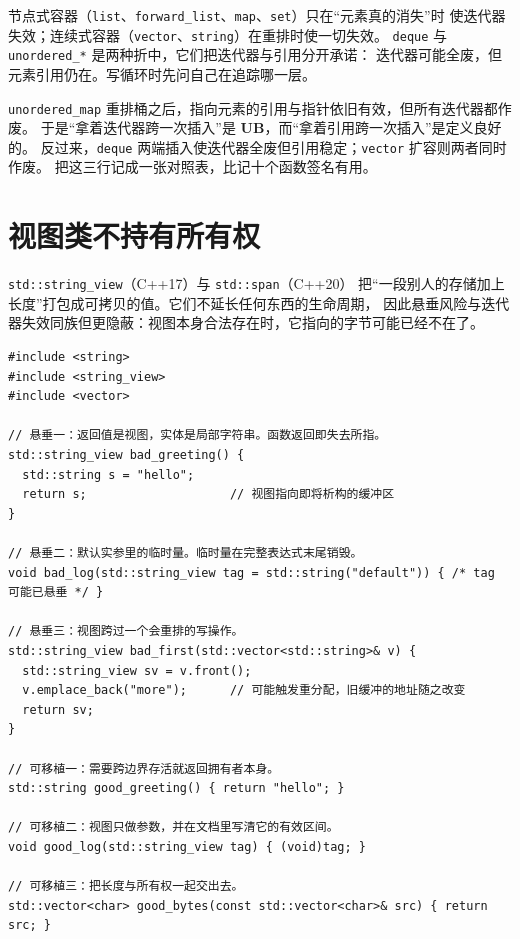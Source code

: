 \documentclass[12pt,a4paper,fontset=fandol]{ctexbook}
\newcommand{\cpp}[1]{C++#1}
\newcommand{\Tp}[1]{\texttt{#1}}
\newcommand{\Bk}{\discretionary{}{}{}}
\newcommand{\UB}{\textbf{\textsf{UB}}}
\begin{document}
\begin{guideline}[title={把长表压成两句话}]
节点式容器（\Tp{list}、\Tp{forward{\Bk}\_list}、\Tp{map}、\Tp{set}）只在“元素真的消失”时
使迭代器失效；连续式容器（\Tp{vector}、\Tp{string}）在重排时使一切失效。
\Tp{deque} 与 \Tp{unordered{\Bk}\_*} 是两种折中，它们把迭代器与引用分开承诺：
迭代器可能全废，但元素引用仍在。写循环时先问自己在追踪哪一层。
\end{guideline}

\begin{warning}[title={引用稳定不等于迭代器稳定}]
\Tp{unordered{\Bk}\_map} 重排桶之后，指向元素的引用与指针依旧有效，但所有迭代器都作废。
于是“拿着迭代器跨一次插入”是 \UB{}，而“拿着引用跨一次插入”是定义良好的。
反过来，\Tp{deque} 两端插入使迭代器全废但引用稳定；\Tp{vector} 扩容则两者同时作废。
把这三行记成一张对照表，比记十个函数签名有用。
\end{warning}

\section{视图类不持有所有权}\label{sec:ub12-views}

\Tp{std::string{\Bk}\_view}（\cpp{17}）与 \Tp{std::span}（\cpp{20}）
把“一段别人的存储加上长度”打包成可拷贝的值。它们不延长任何东西的生命周期，
因此悬垂风险与迭代器失效同族但更隐蔽：视图本身合法存在时，它指向的字节可能已经不在了。

\begin{lstlisting}[style=cppstyle, caption={视图悬垂的三个来源与对应的可移植写法}]
#include <string>
#include <string_view>
#include <vector>

// 悬垂一：返回值是视图，实体是局部字符串。函数返回即失去所指。
std::string_view bad_greeting() {
  std::string s = "hello";
  return s;                    // 视图指向即将析构的缓冲区
}

// 悬垂二：默认实参里的临时量。临时量在完整表达式末尾销毁。
void bad_log(std::string_view tag = std::string("default")) { /* tag 可能已悬垂 */ }

// 悬垂三：视图跨过一个会重排的写操作。
std::string_view bad_first(std::vector<std::string>& v) {
  std::string_view sv = v.front();
  v.emplace_back("more");      // 可能触发重分配，旧缓冲的地址随之改变
  return sv;
}

// 可移植一：需要跨边界存活就返回拥有者本身。
std::string good_greeting() { return "hello"; }

// 可移植二：视图只做参数，并在文档里写清它的有效区间。
void good_log(std::string_view tag) { (void)tag; }

// 可移植三：把长度与所有权一起交出去。
std::vector<char> good_bytes(const std::vector<char>& src) { return src; }
\end{lstlisting}
\end{document}
